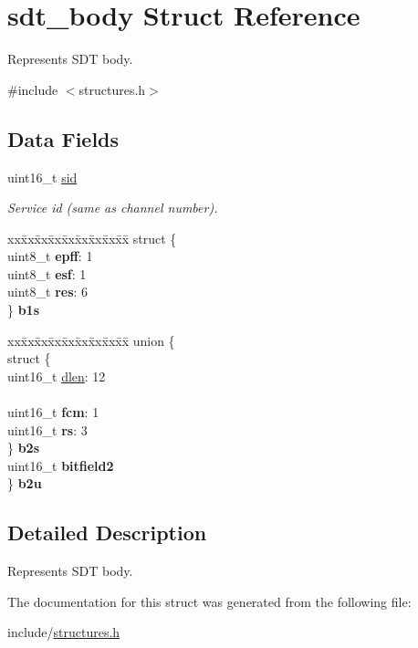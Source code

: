\hypertarget{structsdt__body}{}\section{sdt\+\_\+body Struct Reference}
\label{structsdt__body}


Represents S\+DT body.  




{\ttfamily \#include $<$structures.\+h$>$}

\subsection*{Data Fields}
\begin{DoxyCompactItemize}
\item 
uint16\+\_\+t \hyperlink{structsdt__body_afcbfe244b8b3ac5ce90476403d80b942}{sid}\hypertarget{structsdt__body_afcbfe244b8b3ac5ce90476403d80b942}{}\label{structsdt__body_afcbfe244b8b3ac5ce90476403d80b942}

\begin{DoxyCompactList}\small\item\em Service id (same as channel number). \end{DoxyCompactList}\item 
\begin{tabbing}
xx\=xx\=xx\=xx\=xx\=xx\=xx\=xx\=xx\=\kill
struct \{\\
\>uint8\_t {\bfseries epff}: 1\\
\>uint8\_t {\bfseries esf}: 1\\
\>uint8\_t {\bfseries res}: 6\\
\} {\bfseries b1s}\hypertarget{structsdt__body_a2a62cac7031e11b79a4e8901126f5abe}{}\label{structsdt__body_a2a62cac7031e11b79a4e8901126f5abe}
\\

\end{tabbing}\item 
\begin{tabbing}
xx\=xx\=xx\=xx\=xx\=xx\=xx\=xx\=xx\=\kill
union \{\\
\>struct \{\\
\>\>uint16\_t \hyperlink{structsdt__body_a228e2b0e07a2989524f454aec4f005a6}{dlen}: 12\\
\>\>\\
\>\>uint16\_t {\bfseries fcm}: 1\\
\>\>uint16\_t {\bfseries rs}: 3\\
\>\} {\bfseries b2s}\\
\>uint16\_t {\bfseries bitfield2}\\
\} {\bfseries b2u}\hypertarget{structsdt__body_a9cb497af4c7fdd9f47d0120b08404faa}{}\label{structsdt__body_a9cb497af4c7fdd9f47d0120b08404faa}
\\

\end{tabbing}\end{DoxyCompactItemize}


\subsection{Detailed Description}
Represents S\+DT body. 

The documentation for this struct was generated from the following file\+:\begin{DoxyCompactItemize}
\item 
include/\hyperlink{structures_8h}{structures.\+h}\end{DoxyCompactItemize}
